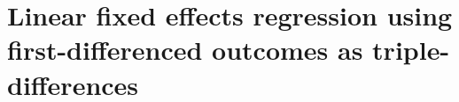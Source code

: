 \documentclass[12pt]{article}\usepackage[]{graphicx}\usepackage[]{color}
\newcommand{\1}{\mathbbm{1}}
\begin{document}
%
%
%

\newpage
\section{Linear fixed effects regression using first-differenced outcomes as triple-differences}
\label{app:proof1}
\end{document}
